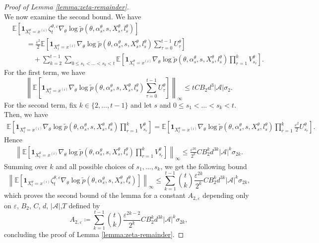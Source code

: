\documentclass[10pt,a4paper]{amsart}
\def\cA{\mathcal{A}}
\def\eps{\varepsilon}
\begin{document}
\begin{proof}[Proof of Lemma \ref{lemma:zeta-remainder}]
\begin{equation}
    \end{equation}
    We now examine the second bound. We have
    \[
    \begin{aligned}
        &\mathbb E \left[ \mathbf 1_{X_t^\theta = x^{(i)}} \zeta_t^{\theta, \eps} \nabla_\theta \log \tilde p (\theta, \alpha_s^{\theta}, s,X_s^\theta, l_s^\theta) \right] \\ 
        &\qquad = \frac{\eps^2}{2} \mathbb E \left[\mathbf 1_{X_t^\theta = x^{(i)}} \nabla_\theta \log \tilde p (\theta, \alpha_s^{\theta}, s,X_s^\theta, l_s^\theta)  \sum_{\tau=0}^{t-1} U_\tau^\theta \right] \\
         &\qquad \quad + \sum_{k=2}^{t-1} \sum_{0 \leq s_1 < \ldots < s_k < t} \mathbb E \left[ \mathbf 1_{X_t^\theta = x^{(i)}} \nabla_\theta \log \tilde p (\theta, \alpha_s^{\theta},s, X_s^\theta, l_s^\theta) \prod_{r=1}^{k} V_{s_r}^\theta \right].
    \end{aligned}
    \]
    For the first term, we have
    \[
    \left\|\mathbb E \left[\mathbf 1_{X_t^\theta = x^{(i)}} \nabla_\theta \log \tilde p (\theta, \alpha_s^{\theta},s, X_s^\theta, l_s^\theta)  \sum_{\tau=0}^{t-1} U_\tau^\theta \right] \right\|_\infty 
    \leq t C B_2 d^3 | \cA | \sigma_2.
    \]
    For the second term, fix $k \in \{2, \ldots, t-1\}$ and let $s$ and $0 \leq s_1 < \ldots < s_k < t$. Then, we have
   \[
   \begin{aligned}
    \mathbb E \left[ \mathbf 1_{X_t^\theta = x^{(i)}} \nabla_\theta \log \tilde p (\theta, \alpha_s^{\theta}, s,X_s^\theta, l_s^\theta) \prod_{r=1}^{k} V_{s_r}^\theta \right]
    = \mathbb E \left[ \mathbf 1_{X_t^\theta = x^{(i)}} \nabla_\theta \log \tilde p (\theta, \alpha_s^{\theta},s, X_s^\theta, l_s^\theta) \prod_{r=1}^{k} \frac{\eps^2}{2} U_{s_r}^\theta \right].
   \end{aligned}
   \] 
   Hence 
   \[
   \begin{aligned}
    \left\| \mathbb E \left[ \mathbf 1_{X_t^\theta = x^{(i)}} \nabla_\theta \log \tilde p (\theta, \alpha_s^{\theta},s, X_s^\theta, l_s^\theta) \prod_{r=1}^{k} V_{s_r}^\theta \right] \right\|_\infty 
    \leq \frac{\eps^{2k}}{2^k} C B_2^{k} d^{3k} | \cA |^k \sigma_{2k}.
   \end{aligned}
   \]
    Summing over $k$ and all possible choices of $s_1, \ldots, s_k$, we get the following bound
    \[
    \left\| \mathbb E \left[
    \mathbf 1_{X_t^\theta = x^{(i)}} \zeta_t^{\theta, \eps} \nabla_\theta \log \tilde p (\theta, \alpha_s^{\theta}, s,X_s^\theta, l_s^\theta)
    \right] \right\|_\infty 
    \leq  \sum_{k=1}^{t-1} \binom{t}{k} \frac{\eps^{2k}}{2^k} C B_2^{k} d^{3k} | \cA |^k \sigma_{2k},
    \]
    which proves the second bound of the lemma for a constant $A_{2,\eps}$ depending only on $\eps$, $B_2$, $C$, $d$, $| \cA |$,$T$ defined by
    \begin{equation}
        \label{eq:def-A2}
        A_{2, \eps} \coloneq \sum_{k=1}^{t-1} \binom{t}{k} \frac{\eps^{2k - 2}}{2^k} C B_2^{k} d^{3k} | \cA |^k \sigma_{2k},
    \end{equation}
    concluding the proof of Lemma \ref{lemma:zeta-remainder}.
\end{proof}
\end{document}
